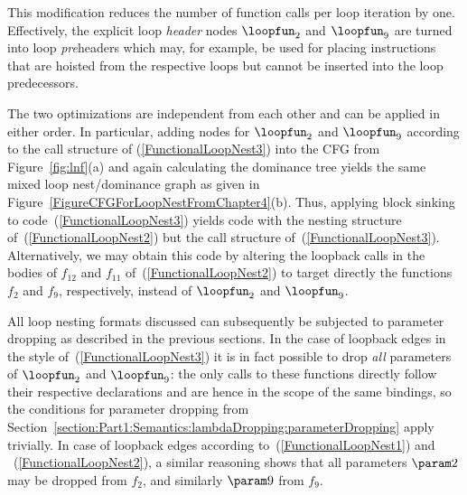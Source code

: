 This modification reduces the number of function calls per loop
iteration by one. Effectively, the explicit loop \emph{header} nodes
$\loopfun_2$ and $\loopfun_9$ are turned into loop \emph{pre}headers
which may, for example, be used for placing instructions that are
hoisted from the respective loops but cannot be inserted into the loop
predecessors.

The two optimizations are independent from each other and can be
applied in either order. In particular, adding nodes for $\loopfun_2$
and $\loopfun_9$ according to the call structure of
(\ref{FunctionalLoopNest3}) into the CFG from Figure~\ref{fig:lnf}(a)
and again calculating the dominance tree yields the same mixed loop
nest/dominance graph as given in
Figure~\ref{FigureCFGForLoopNestFromChapter4}(b). Thus, applying block
sinking to code~(\ref{FunctionalLoopNest3}) yields code with the
nesting structure of~(\ref{FunctionalLoopNest2}) but the call structure
of~(\ref{FunctionalLoopNest3}). Alternatively, we may obtain this code
by altering the loopback calls in the bodies of $f_{12}$ and $f_{11}$
of~(\ref{FunctionalLoopNest2}) to target directly the functions $f_2$
and $f_9$, respectively, instead of $\loopfun_2$ and $\loopfun_9$.

All loop nesting formats discussed can subsequently be subjected to
parameter dropping as described in the previous sections. In the case
of loopback edges in the style of~(\ref{FunctionalLoopNest3}) it is in
fact possible to drop
\emph{all} parameters of $\loopfun_2$ and $\loopfun_9$: the only
calls to these functions directly follow their respective declarations
and are hence in the scope of the same bindings, so the conditions for
parameter dropping from
Section~\ref{section:Part1:Semantics:lambdaDropping:parameterDropping}
apply trivially.  In case of loopback edges according
to~(\ref{FunctionalLoopNest1}) and ~(\ref{FunctionalLoopNest2}), a
similar reasoning shows that all parameters $\param 2$ may be dropped
from $f_2$, and similarly $\param 9$ from $f_9$.

